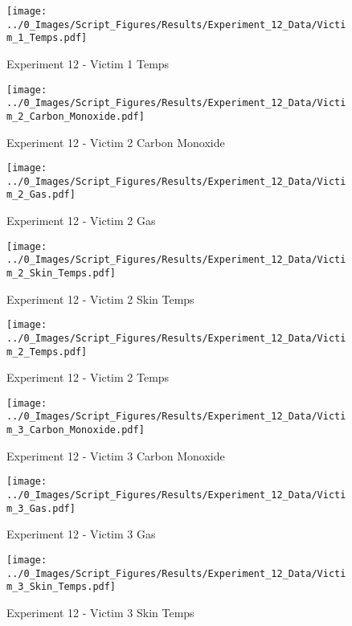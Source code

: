 	\begin{figure}[H]
		\centering
		\texttt{[image: ../0\_Images/Script\_Figures/Results/Experiment\_12\_Data/Victim\_1\_Temps.pdf]}
		\caption[]{Experiment 12 - Victim 1 Temps}
	\end{figure}
 
	\clearpage

	\begin{figure}[H]
		\centering
		\texttt{[image: ../0\_Images/Script\_Figures/Results/Experiment\_12\_Data/Victim\_2\_Carbon\_Monoxide.pdf]}
		\caption[]{Experiment 12 - Victim 2 Carbon Monoxide}
	\end{figure}
 

	\begin{figure}[H]
		\centering
		\texttt{[image: ../0\_Images/Script\_Figures/Results/Experiment\_12\_Data/Victim\_2\_Gas.pdf]}
		\caption[]{Experiment 12 - Victim 2 Gas}
	\end{figure}
 
	\clearpage

	\begin{figure}[H]
		\centering
		\texttt{[image: ../0\_Images/Script\_Figures/Results/Experiment\_12\_Data/Victim\_2\_Skin\_Temps.pdf]}
		\caption[]{Experiment 12 - Victim 2 Skin Temps}
	\end{figure}
 

	\begin{figure}[H]
		\centering
		\texttt{[image: ../0\_Images/Script\_Figures/Results/Experiment\_12\_Data/Victim\_2\_Temps.pdf]}
		\caption[]{Experiment 12 - Victim 2 Temps}
	\end{figure}
 
	\clearpage

	\begin{figure}[H]
		\centering
		\texttt{[image: ../0\_Images/Script\_Figures/Results/Experiment\_12\_Data/Victim\_3\_Carbon\_Monoxide.pdf]}
		\caption[]{Experiment 12 - Victim 3 Carbon Monoxide}
	\end{figure}
 

	\begin{figure}[H]
		\centering
		\texttt{[image: ../0\_Images/Script\_Figures/Results/Experiment\_12\_Data/Victim\_3\_Gas.pdf]}
		\caption[]{Experiment 12 - Victim 3 Gas}
	\end{figure}
 
	\clearpage

	\begin{figure}[H]
		\centering
		\texttt{[image: ../0\_Images/Script\_Figures/Results/Experiment\_12\_Data/Victim\_3\_Skin\_Temps.pdf]}
		\caption[]{Experiment 12 - Victim 3 Skin Temps}
	\end{figure}
 

